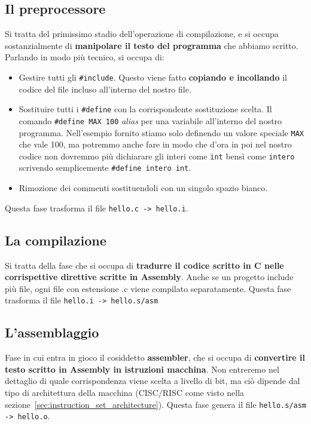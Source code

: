 \documentclass[12pt]{report}
\begin{document}
	\subsection{Il preprocessore}
	Si tratta del primissimo stadio dell'operazione di compilazione, e si occupa sostanzialmente di \textbf{manipolare il testo del programma} che abbiamo scritto. Parlando in modo più tecnico, si occupa di:
	\begin{itemize}
		\item Gestire tutti gli \texttt{\#include}. Questo viene fatto \textbf{copiando e incollando} il codice del file incluso all'interno del nostro file.
		
		\item Sostituire tutti i \texttt{\#define} con la corrispondente sostituzione scelta. Il comando \texttt{\#define MAX 100} \textit{alias} per una variabile all'interno del nostro programma. Nell'esempio fornito stiamo solo definendo un valore speciale \texttt{MAX} che vale 100, ma potremmo anche fare in modo che d'ora in poi nel nostro codice non dovremmo più dichiarare gli interi come \texttt{int} bensì come \texttt{intero} scrivendo semplicemente \texttt{\#define intero int}.
		
		\item Rimozione dei commenti sostituendoli con un singolo spazio bianco.
	\end{itemize}
	Questa fase trasforma il file \texttt{hello.c -> hello.i}.
	
	\subsection{La compilazione}
	Si tratta della fase che si occupa di \textbf{tradurre il codice scritto in C nelle corrispettive direttive scritte in Assembly}.
	Anche se un progetto include più file, ogni file con estensione .c viene compilato separatamente.
	Questa fase trasforma il file \texttt{hello.i -> hello.s/asm}
	
	\subsection{L'assemblaggio}
	Fase in cui entra in gioco il cosiddetto \textbf{assembler}, che si occupa di \textbf{convertire il testo scritto in Assembly in istruzioni macchina}. Non entreremo nel dettaglio di quale corrispondenza viene scelta a livello di bit, ma ciò dipende dal tipo di architettura della macchina (CISC/RISC come visto nella sezione~\ref{sec:instruction_set_architecture}). Questa fase genera il file \texttt{hello.s/asm -> hello.o}.
	
\end{document}
